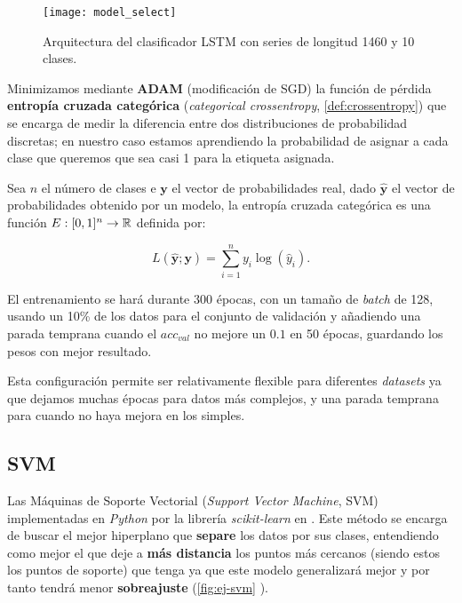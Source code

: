 \begin{figure}[htbp]
  \centering
  \texttt{[image: model\_select]}
  \caption{Arquitectura del clasificador LSTM con series de longitud 1460 y 10 clases.}
  \label{fig:model-select}
\end{figure}

Minimizamos mediante \textbf{ADAM} (modificación de SGD) la función de pérdida \textbf{entropía cruzada categórica} (\emph{categorical crossentropy}, \autoref{def:crossentropy}) que se encarga de medir la diferencia entre dos distribuciones de probabilidad discretas; en nuestro caso estamos aprendiendo la probabilidad de asignar a cada clase que queremos que sea casi 1 para la etiqueta asignada.

\begin{definicion}
  Sea $n$ el número de clases e $\textbf{y}$ el vector de probabilidades real, dado $\hat{\textbf{y}}$ el vector de probabilidades obtenido por un modelo, la entropía cruzada categórica es una función $E : [0, 1]^n \to \mathbb{R}$ definida por:

  $$ L(\hat{\textbf{y}} ; \textbf{y}) = \sum \limits^n_{i = 1} y_i \log(\hat{y}_i).$$
  \label{def:crossentropy}
\end{definicion}

El entrenamiento se hará durante 300 épocas, con un tamaño de \emph{batch} de 128, usando un 10\% de los datos para el conjunto de validación y añadiendo una parada temprana cuando el $acc_{val}$ no mejore un $0.1$ en 50 épocas, guardando los pesos con mejor resultado.

Esta configuración permite ser relativamente flexible para diferentes \emph{datasets} ya que dejamos muchas épocas para datos más complejos, y una parada temprana para cuando no haya mejora en los simples.

\subsection{SVM}

Las Máquinas de Soporte Vectorial (\emph{Support Vector Machine}, SVM) \cite{cortes1995support} implementadas en \emph{Python} por la librería \emph{scikit-learn} en \cite{scikit2020svm}. Este método se encarga de buscar el mejor hiperplano que \textbf{separe} los datos por sus clases, entendiendo como mejor el que deje a \textbf{más distancia} los puntos más cercanos (siendo estos los puntos de soporte) que tenga ya que este modelo generalizará mejor y por tanto tendrá menor \textbf{sobreajuste} (\autoref{fig:ej-svm} \cite{JavaTpointSVM}).

